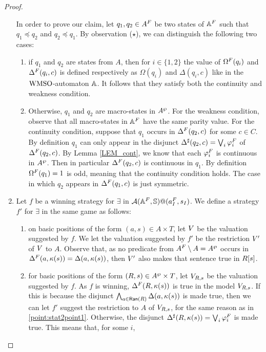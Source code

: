 \begin{proof}
\begin{enumerate}
      In order to prove our claim, let $q_1,q_2 \in A^{F}$ be two states of $\mathbb{A}^{F}$ such that $q_1 \preceq q_2$ and $q_2 \preceq q_1$. By observation ($\star$), we can distinguish the following two cases:
      \begin{enumerate}[(\roman*)]
        \item if $q_1$ and $q_2$ are states from $A$, then for $i \in \{1,2\}$ the value of $\Omega^{F}(q_i)$ and $\Delta^{F}(q_i,c)$ is defined respectively as $\Omega(q_i)$ and $\Delta(q_i,c)$ like in the $\mathrm{WMSO}$-automaton $\mathbb{A}$. It follows that they satisfy both the continuity and weakness condition.
        \item Otherwise, $q_1$ and $q_2$ are macro-states in $A^{\wp}$. For the weakness condition, observe that all macro-states in $\mathbb{A}^{F}$ have the same parity value. For the continuity condition, suppose that $q_1$ occurs in $\Delta^{F}(q_2,c)$ for some $c \in C$. By definition $q_1$ can only appear in the disjunct $\Delta^{\sharp}(q_2,c) = \bigvee_{i}\varphi_i^{F}$ of $\Delta^{F}(q_2,c)$. By Lemma \ref{LEM_cont}, we know that each $\varphi_i^{F}$ is continuous in $A^{\wp}$. Then in particular $\Delta^{F}(q_2,c)$ is continuous in $q_1$. By definition $\Omega^{F}(q_1) =1$ is odd, meaning that the continuity condition holds. The case in which $q_2$ appears in $\Delta^{F}(q_1,c)$ is just symmetric.
      \end{enumerate}
  \item  Let $f$ be a winning strategy for $\exists$ in $\mathcal{A}(\mathbb{A}^{F},\mathbb{S})@(a_I^{F},s_I)$. We define a strategy $f'$ for $\exists$ in the same game as follows:
      \begin{enumerate}[label=(\alph*),ref=\alph*]
        \item on basic positions of the form $(a,s) \in A\times T$, let $V$ be the valuation suggested by $f$. We let the valuation suggested by $f'$ be the restriction $V'$ of $V$ to $A$. Observe that, as no predicate from $A^{F}\setminus A =A^{\wp}$ occurs in $\Delta^{F}(a,\kappa(s)) = \Delta(a,\kappa(s))$, then $V'$ also makes that sentence true in $R[s]$.
        \begin{comment} With minimality
        on basic positions of the form $(a,s) \in A\times T$, $f'$ is defined as $f$. Indeed, as no predicate from $\shA$ occurs in $\Delta^{\f}(a,\V(s))$, we can assume that the valuation suggested by $f$ does not assign any of them to nodes in $\R{s}$.
        \end{comment}
        \label{point:stat2point1}
        \item for basic positions of the form $(R,s) \in A^{\wp} \times T$, let $V_{R,s}$ be the valuation suggested by $f$. As $f$ is winning, $\Delta^{F}(R,\kappa(s))$ is true in the model $V_{R,s}$. If this is because the disjunct $\bigwedge_{a \in \mathsf{Ran}(R)} \Delta(a,\kappa(s))$ is made true, then we can let $f'$ suggest the restriction to $A$ of $V_{R,s}$, for the same reason as in \eqref{point:stat2point1}. Otherwise, the disjunct $\Delta^{\sharp}(R,\kappa(s)) = \bigvee_{i}\varphi_i^{F}$ is made true. This means that, for some $i$,

\end{enumerate}
\end{enumerate}
\end{proof}
